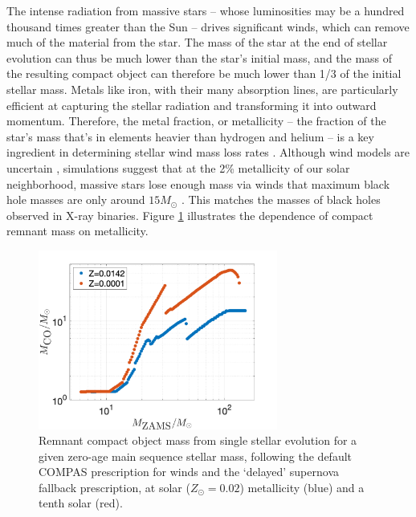 \documentclass[iop,onecolumn]{revtex4}
\newcommand{\todo}[1]{\textcolor{red}{#1}}
\begin{document}
The intense radiation from massive stars -- whose luminosities may be a hundred thousand times greater than the Sun -- drives significant winds, which can remove much of the material from the star. The mass of the star at the end of stellar evolution can thus be much lower than the star's initial mass, and the mass of the resulting compact object can therefore be much lower than 1/3 of the initial stellar mass. Metals like iron, with their many absorption lines, are particularly efficient at capturing the stellar radiation and transforming it into outward momentum.  Therefore, the metal fraction, or metallicity -- the fraction of the star's mass that's in elements heavier than hydrogen and helium -- is a key ingredient in determining stellar wind mass loss rates \citep{Vink:2001}. Although wind models are uncertain \citep[e.g.,][]{Renzo:2017}, simulations suggest that at the 2\% metallicity of our solar neighborhood, massive stars lose enough mass via winds that maximum black hole masses are only around $15 M_\odot$ \citep{Belczynski:2009,Spera:2015}. This matches the masses of black holes observed in X-ray binaries. Figure \ref{fig:BHremnant} illustrates the dependence of compact remnant mass on metallicity. 
 
\begin{figure}
	\centering
	\includegraphics[width=0.7\textwidth]{BHremnantdelayed.png}
	\caption{\label{fig:BHremnant} Remnant compact object mass from single stellar evolution for a given zero-age main sequence stellar mass, following the default COMPAS prescription for winds \citep{Stevenson:2017}  and the `delayed' \citet{Fryer:2012} supernova fallback prescription, at solar ($Z_\odot=0.02$) metallicity (blue) and a tenth solar (red).%
	} 
\end{figure}
\end{document}

